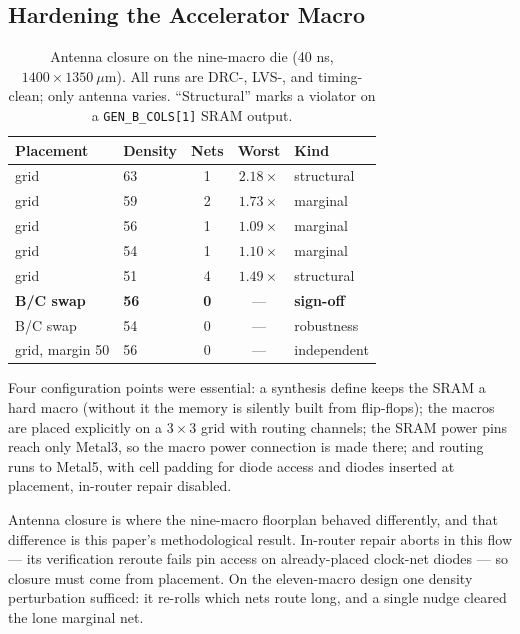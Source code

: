 \documentclass[conference,a4paper]{APSIPA2026}
\begin{document}
\subsection{Hardening the Accelerator Macro}

\begin{table}[!ht]
\caption{Antenna closure on the nine-macro die (40 ns, $1400\times1350~\mu$m). All runs are DRC-, LVS-, and timing-clean; only antenna varies. ``Structural'' marks a violator on a \texttt{GEN\_B\_COLS[1]} SRAM output.}
\label{tab:antenna}
\centering
\renewcommand{\arraystretch}{1.0}
\begin{tabular}{@{}llccl@{}}
\toprule
Placement & Density & Nets & Worst & Kind \\
\midrule
grid            & 63 & 1 & $2.18\times$ & structural \\
grid            & 59 & 2 & $1.73\times$ & marginal \\
grid            & 56 & 1 & $1.09\times$ & marginal \\
grid            & 54 & 1 & $1.10\times$ & marginal \\
grid            & 51 & 4 & $1.49\times$ & structural \\
\midrule
\textbf{B/C swap} & \textbf{56} & \textbf{0} & --- & \textbf{sign-off} \\
B/C swap        & 54 & 0 & --- & robustness \\
grid, margin 50 & 56 & 0 & --- & independent \\
\bottomrule
\end{tabular}
\end{table}
Four configuration points were essential: a synthesis define keeps the SRAM a hard macro (without it the memory is silently built from flip-flops); the macros are placed explicitly on a $3\times3$ grid with routing channels; the SRAM power pins reach only Metal3, so the macro power connection is made there; and routing runs to Metal5, with cell padding for diode access and diodes inserted at placement, in-router repair disabled.

Antenna closure is where the nine-macro floorplan behaved differently, and that difference is this paper's methodological result. In-router repair aborts in this flow --- its verification reroute fails pin access on already-placed clock-net diodes --- so closure must come from placement. On the eleven-macro design one density perturbation sufficed: it re-rolls which nets route long, and a single nudge cleared the lone marginal net.
\end{document}
